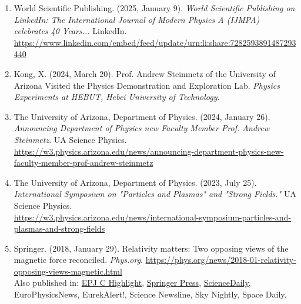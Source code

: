 \documentclass[11pt]{article}
\begin{document}
\begin{enumerate}[leftmargin=*,nosep]
    \item World Scientific Publishing. (2025, January 9). \textit{World Scientific Publishing on LinkedIn: The International Journal of Modern Physics A (IJMPA) celebrates 40 Years...} LinkedIn. \\ \href{https://www.linkedin.com/embed/feed/update/urn:li:share:7282593891487293440}{https://www.linkedin.com/embed/feed/update/urn:li:share:7282593891487293440}
    \item Kong, X. (2024, March 20). Prof. Andrew Steinmetz of the University of Arizona Visited the Physics Demonstration and Exploration Lab. \textit{Physics Experiments at HEBUT, Hebei University of Technology.}
    \item The University of Arizona, Department of Physics. (2024, January 26). \textit{Announcing Department of Physics new Faculty Member Prof. Andrew Steinmetz}. UA Science Physics. \\ {\footnotesize\href{https://w3.physics.arizona.edu/news/announcing-department-physics-new-faculty-member-prof-andrew-steinmetz}{https://w3.physics.arizona.edu/news/announcing-department-physics-new-faculty-member-prof-andrew-steinmetz}}
    \item The University of Arizona, Department of Physics. (2023, July 25). \textit{International Symposium on "Particles and Plasmas" and "Strong Fields."} UA Science Physics. \\ {\footnotesize\href{https://w3.physics.arizona.edu/news/international-symposium-particles-and-plasmas-and-strong-fields}{https://w3.physics.arizona.edu/news/international-symposium-particles-and-plasmas-and-strong-fields}}
    \item Springer. (2018, January 29). Relativity matters: Two opposing views of the magnetic force reconciled. \textit{Phys.org}. \href{https://phys.org/news/2018-01-relativity-opposing-views-magnetic.html}{https://phys.org/news/2018-01-relativity-opposing-views-magnetic.html}\\[0.3em]
    Also published in: \href{https://www.epj.org/epjc-news/1422-epjc-highlight-relativity-matters-two-opposing-views-of-the-magnetic-force-reconciled}{EPJ C Highlight}, \href{https://www.springer.com/gp/about-springer/media/research-news/all-english-research-news/relativity-matters--two-opposing-views-of-the-magnetic-force-reconciled/15417658}{Springer Press}, \href{https://www.sciencedaily.com/releases/2018/01/180129131327.htm}{ScienceDaily}, EuroPhysicsNews, EurekAlert!, Science Newsline, Sky Nightly, Space Daily.
\end{enumerate}
\end{document}

